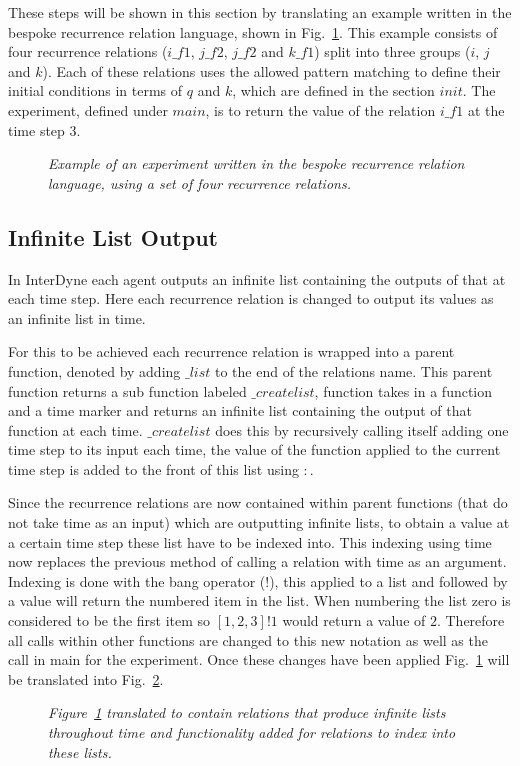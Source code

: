 \documentclass{article}
\begin{document}
These steps will be shown in this section by translating an example written in the bespoke recurrence relation language, shown in Fig.~\ref{fig:rre1}. This example consists of four recurrence relations ($i\_f1$, $j\_f2$, $j\_f2$ and $k\_f1$) split into three groups ($i$, $j$ and $k$). Each of these relations uses the allowed pattern matching to define their initial conditions in terms of $q$ and $k$, which are defined in the section $init$. The experiment, defined under $main$, is to return the value of the relation $i\_f1$ at the time step 3.  
\begin{figure}[H]
	\centering
	
	\caption{\it Example of an experiment written in the bespoke recurrence relation language, using a set of four recurrence relations.}
	\label{fig:rre1}
\end{figure} 





\subsection{Infinite List Output}
In InterDyne each agent outputs an infinite list containing the outputs of that at each time step. Here each recurrence relation is changed to output its values as an infinite list in time.

For this to be achieved each recurrence relation is wrapped into a parent function, denoted by adding $\_list$ to the end of the relations name. This parent function returns a sub function labeled $\_createlist$, function takes in a function and a time marker and returns an infinite list containing the output of that function at each time. $\_createlist$ does this by recursively calling itself adding one time step to its input each time, the value of the function applied to the current time step is added to the front of this list using $:$.
 
Since the recurrence relations are now contained within parent functions (that do not take time as an input) which are outputting infinite lists, to obtain a value at a certain time step these list have to be indexed into. This indexing using time now replaces the previous method of calling a relation with time as an argument. Indexing is done with the bang operator ($!$), this applied to a list and followed by a value will return the numbered item in the list. When numbering the list zero is considered to be the first item so $[1,2,3]!1$ would return a value of $2$. Therefore all calls within other functions are changed to this new notation as well as the call in main for the experiment. Once these changes have been applied Fig.~\ref{fig:rre1} will be translated into Fig.~\ref{fig:ts1}.
\begin{figure}[H]
	\centering
	
	\caption{\it Figure~\ref{fig:rre1} translated to contain relations that produce infinite lists throughout time and functionality added for relations to index into these lists.}
	\label{fig:ts1}
\end{figure} 
\end{document}

